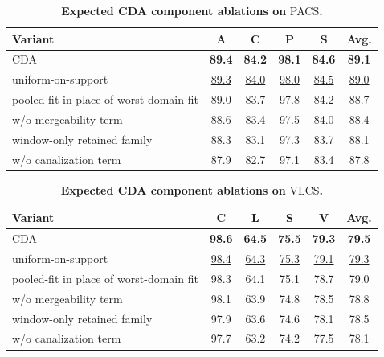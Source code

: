 \documentclass[10pt]{article}
\newcommand{\data}[1]{\textsc{#1}}
\newcommand{\Expected}[1]{#1}
\newcommand{\Best}[1]{\textbf{\Expected{#1}}}
\newcommand{\Second}[1]{\underline{\Expected{#1}}}
\begin{document}
\begin{table}[H]
\centering
\small
\renewcommand{\arraystretch}{1.08}
\caption{\textbf{Expected CDA component ablations on} \data{PACS}\textbf{.}}
\label{tab:cda_pacs_ablation_expected}
\setlength{\tabcolsep}{4pt}
\begin{tabular}{lccccc}
\toprule
\textbf{Variant} & \textbf{A} & \textbf{C} & \textbf{P} & \textbf{S} & \textbf{Avg.} \\
\midrule
CDA & \Best{89.4} & \Best{84.2} & \Best{98.1} & \Best{84.6} & \Best{89.1} \\
uniform-on-support & \Second{89.3} & \Second{84.0} & \Second{98.0} & \Second{84.5} & \Second{89.0} \\
pooled-fit in place of worst-domain fit & \Expected{89.0} & \Expected{83.7} & \Expected{97.8} & \Expected{84.2} & \Expected{88.7} \\
w/o mergeability term & \Expected{88.6} & \Expected{83.4} & \Expected{97.5} & \Expected{84.0} & \Expected{88.4} \\
window-only retained family & \Expected{88.3} & \Expected{83.1} & \Expected{97.3} & \Expected{83.7} & \Expected{88.1} \\
w/o canalization term & \Expected{87.9} & \Expected{82.7} & \Expected{97.1} & \Expected{83.4} & \Expected{87.8} \\
\bottomrule
\end{tabular}
\end{table}

\begin{table}[H]
\centering
\small
\renewcommand{\arraystretch}{1.08}
\caption{\textbf{Expected CDA component ablations on} \data{VLCS}\textbf{.}}
\label{tab:cda_vlcs_ablation_expected}
\setlength{\tabcolsep}{4pt}
\begin{tabular}{lccccc}
\toprule
\textbf{Variant} & \textbf{C} & \textbf{L} & \textbf{S} & \textbf{V} & \textbf{Avg.} \\
\midrule
CDA & \Best{98.6} & \Best{64.5} & \Best{75.5} & \Best{79.3} & \Best{79.5} \\
uniform-on-support & \Second{98.4} & \Second{64.3} & \Second{75.3} & \Second{79.1} & \Second{79.3} \\
pooled-fit in place of worst-domain fit & \Expected{98.3} & \Expected{64.1} & \Expected{75.1} & \Expected{78.7} & \Expected{79.0} \\
w/o mergeability term & \Expected{98.1} & \Expected{63.9} & \Expected{74.8} & \Expected{78.5} & \Expected{78.8} \\
window-only retained family & \Expected{97.9} & \Expected{63.6} & \Expected{74.6} & \Expected{78.1} & \Expected{78.5} \\
w/o canalization term & \Expected{97.7} & \Expected{63.2} & \Expected{74.2} & \Expected{77.5} & \Expected{78.1} \\
\bottomrule
\end{tabular}
\end{table}
\end{document}
